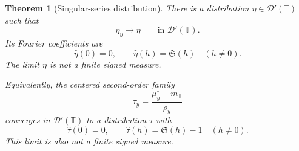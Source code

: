 \documentclass[11pt]{article}
\newtheorem{theorem}{Theorem}[section]
\theoremstyle{definition}
\theoremstyle{remark}
\newcommand{\T}{\mathbb T}
\newcommand{\cD}{\mathcal D}
\begin{document}
\begin{theorem}[Singular-series distribution]\label{thm:distribution-limit}
There is a distribution $\eta\in\cD'(\T)$ such that
\begin{equation}\label{eq:distribution-convergence}
    \eta_y\longrightarrow\eta
    \qquad\text{in }\cD'(\T).
\end{equation}
Its Fourier coefficients are
\begin{equation}\label{eq:distribution-coefficients}
    \widehat\eta(0)=0,
    \qquad
    \widehat\eta(h)=\mathfrak S(h)\quad(h\ne0).
\end{equation}
The limit $\eta$ is not a finite signed measure.

Equivalently, the centered second-order family
\begin{equation}\label{eq:centered-second-order}
    \tau_y=\frac{\mu_y^\circ-m_{\T}}{\rho_y}
\end{equation}
converges in $\cD'(\T)$ to a distribution $\tau$ with
\begin{equation}\label{eq:centered-second-coefficients}
    \widehat\tau(0)=0,
    \qquad
    \widehat\tau(h)=\mathfrak S(h)-1\quad(h\ne0).
\end{equation}
This limit is also not a finite signed measure.
\end{theorem}
\end{document}
